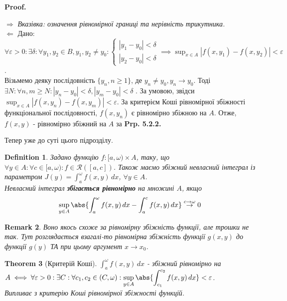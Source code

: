 \documentclass[a4paper, 10pt]{article}
\makeatletter
\def\huge{\displaystyle}
\def\qed{$\blacksquare$}
\def\rightproof{$\boxed{\Rightarrow}$ }
\def\leftproof{$\boxed{\Leftarrow}$ }
\theoremstyle{theoremdd}
\newtheorem{theorem}{Theorem}[subsection]
\theoremstyle{theoremdd}
\theoremstyle{theoremdd}
\newtheorem{definition}[theorem]{Definition}
\theoremstyle{theoremdd}
\theoremstyle{theoremdd}
\theoremstyle{theoremdd}
\theoremstyle{theoremdd}
\newtheorem{remark}[theorem]{Remark}
\theoremstyle{theoremdd}
\theoremstyle{theoremdd}
\renewenvironment{proof}[1][Proof.\\]{\par
\pushQED{\hfill \qed}%
\normalfont \topsep6\p@\@plus6\p@\relax
\trivlist
\item\relax
{\bfseries
#1\@addpunct{.}}\hspace\labelsep\ignorespaces
}{%
\popQED\endtrivlist\@endpefalse
}
\makeatother
\begin{document}
\begin{proof}
\rightproof \textit{Вказівка: означення рівномірної границі та нерівність трикутника.}
\bigskip \\
\leftproof Дано: $\forall \varepsilon > 0: \exists \delta: \forall y_1,y_2 \in B, y_1,y_2 \neq y_0: \begin{cases} |y_1-y_0| < \delta \\ |y_2-y_0| < \delta \end{cases} \implies \huge\sup_{x \in A} |f(x,y_1)-f(x,y_2)| < \varepsilon$.\\
Візьмемо деяку послідовність $\{y_n, n \geq 1\}$, де $y_n \neq y_0, y_n \to y_0$. Тоді \\ $\exists N: \forall n,m \geq N: |y_n-y_0| < \delta, |y_m - y_0| < \delta$ . За умовою, звідси $\huge\sup_{x \in A} |f(x,y_n) - f(x,y_m)| < \varepsilon$. За критерієм Коші рівномірної збіжності функціональної послідовності, $f(x,y_n)$ є рівномірно збіжною на $A$. Отже, $f(x,y)$ - рівномірно збіжний на $A$ за \textbf{Prp. 5.2.2.}
\end{proof}

Тепер уже до суті цього підрозділу.

\begin{definition}
Задано функцію $f: [a,\omega) \times A$, таку, що $\forall y \in A: \forall c \in [a,\omega): f\in \mathcal{R}([a,c])$. Також маємо збіжний невласний інтеграл із параметром $J(y)= \huge \int_a^\omega f(x,y)\,dx$, $\forall y \in A$.\\
Невласний інтеграл \textbf{збігається рівномірно} на множині $A$, якщо
\begin{align*}
\huge \sup_{y \in A} \abs{\int_a^\omega f(x,y)\,dx - \int_a^c f(x,y)\,dx} \overset{c \to \omega}{\to} 0
\end{align*}
\end{definition}

\begin{remark}
Воно якось схоже за рівномірну збіжність функції, але трошки не так. Тут розглядається взагалі-то рівномірна збіжність функції $g(x,y)$ до функції $g(y)$ ТА при цьому аргумент $x \to x_0$.
\end{remark}

\begin{theorem}[Критерій Коші]
$\huge \int_a^\omega f(x,y)\,dx$ - збіжний рівномірно на $A \iff \forall \varepsilon > 0: \exists C: \forall c_1,c_2 \in (C,\omega): \huge \sup_{y \in A} \abs{\int_{c_1}^{c_2} f(x,y)\,dx} < \varepsilon$.\\
\textit{Випливає з критерію Коші рівномірної збіжності функцій.}
\end{theorem}
\end{document}
